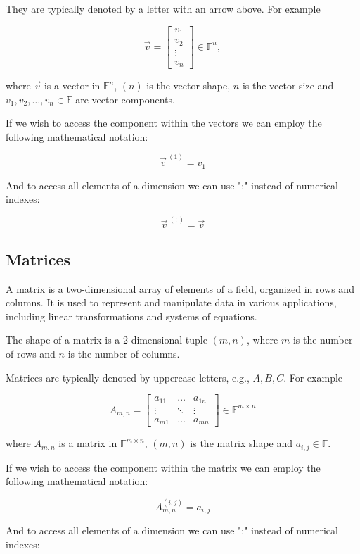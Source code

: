 They are typically denoted by a letter with an arrow above. For example

$$
\vec v =\begin{bmatrix}
    v_1\\
    v_2\\
    \vdots\\
    v_n
\end{bmatrix} \in \mathbb{F}^n,
$$

where $\vec v$ is a vector in $\mathbb F^n$, $(n)$ is the vector shape, $n$ is the vector size and $v_1, v_2, \dots, v_n \in \mathbb{F}$ are vector components.

If we wish to access the component within the vectors we can employ the following mathematical notation: 

$$
\vec v^{\ (1)} = v_1
$$

And to access all elements of a dimension we can use ":" instead of numerical indexes:

$$
\vec v^{\ (:)} = \vec v
$$

\subsection{Matrices}
A matrix is a two-dimensional array of elements of a field, organized in rows and columns. It is used to represent and manipulate data in various applications, including linear transformations and systems of equations.

The shape of a matrix is a 2-dimensional tuple $(m,n)$, where $m$ is the number of rows and $n$ is the number of columns. 

Matrices are typically denoted by uppercase letters, e.g., $A, B, C$. For example 

$$
A_{m,n} = \begin{bmatrix} 
    a_{11} & \dots  & a_{1n}\\
    \vdots & \ddots & \vdots\\
    a_{m1} & \dots  & a_{mn} 
\end{bmatrix} \in \mathbb{F}^{m \times n}
$$

where $A_{m,n}$ is a matrix in $\mathbb{F}^{m \times n}$, $(m, n)$ is the matrix shape and $a_{i,j} \in \mathbb F$.

If we wish to access the component within the matrix we can employ the following mathematical notation: 

$$
A_{m,n}^{(i, j)} = a_{i,j}
$$

And to access all elements of a dimension we can use ":" instead of numerical indexes:

